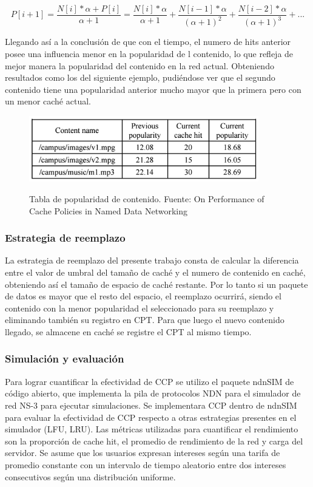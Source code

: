 \documentclass[12pt]{ociamthesis}  %
\begin{document}
\begin{equation}
P[i+1] = \frac{N[i]*\alpha+P[i]}{\alpha+1}
	   = \frac{N[i]*\alpha}{\alpha+1} + \frac{N[i-1]*\alpha}{(\alpha+1)^2} + \frac{N[i-2]*\alpha}{(\alpha+1)^3} + ...
\end{equation}

Llegando así a la conclusión de que con el tiempo, el numero de hits anterior posee una influencia menor en la popularidad de l contenido, lo que refleja de mejor manera la popularidad del contenido en la red actual. Obteniendo resultados como los del siguiente ejemplo, pudiéndose ver que el segundo contenido tiene una popularidad anterior mucho mayor que la primera pero con un menor caché actual.

\begin{figure}[!htb]
	\centering
	\includegraphics[width=10cm]{Imagenes/Paper1.1/TablaPopularidadContenido}\\
	\caption{Tabla de popularidad de contenido. Fuente: On Performance of Cache Policies in Named Data Networking \cite{ran2013performance}}
	\label{tabla_popularidad_contenido}
\end{figure}

\subsubsection{Estrategia de reemplazo}

La estrategia de reemplazo del presente trabajo consta de calcular la diferencia entre el valor de umbral del tamaño de caché y el numero de contenido en caché, obteniendo así el tamaño de espacio de caché restante. Por lo tanto si un paquete de datos es mayor que el resto del espacio, el reemplazo ocurrirá, siendo el contenido con la menor popularidad el seleccionado para su reemplazo y eliminando también su registro en CPT. Para que luego el nuevo contenido llegado, se almacene en caché se registre el CPT al mismo tiempo.\\

\subsubsection{Simulación y evaluación}
Para lograr cuantificar la efectividad de CCP se utilizo el paquete ndnSIM de código abierto, que implementa la pila de protocolos NDN para el simulador de red NS-3 para ejecutar simulaciones. Se implementara CCP dentro de ndnSIM para evaluar la efectividad de CCP respecto a otras estrategias presentes en el simulador (LFU, LRU). Las métricas utilizadas para cuantificar el rendimiento son la proporción de cache hit, el promedio de rendimiento de la red y carga del servidor. Se asume que los usuarios expresan intereses según una tarifa de promedio constante con un intervalo de tiempo aleatorio entre dos intereses consecutivos según una distribución uniforme.\\
\end{document}
